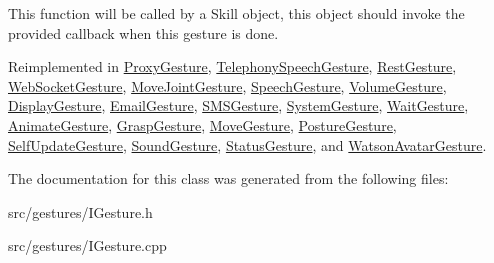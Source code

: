 This function will be called by a Skill object, this object should invoke the provided callback when this gesture is done. 

Reimplemented in \hyperlink{class_proxy_gesture_a771b299c01bfaac71566e0c42353f3bf}{Proxy\+Gesture}, \hyperlink{class_telephony_speech_gesture_a9ee4eca6da4830ddcbcffd5c3a13cd30}{Telephony\+Speech\+Gesture}, \hyperlink{class_rest_gesture_a84673c22b5a8d5c30b946149b4884d6c}{Rest\+Gesture}, \hyperlink{class_web_socket_gesture_ad783a6eef384b037b5272e41d86e1305}{Web\+Socket\+Gesture}, \hyperlink{class_move_joint_gesture_a05ffbd58e927b0f42aba6756925602ea}{Move\+Joint\+Gesture}, \hyperlink{class_speech_gesture_a353c573afdea4713e12e88de207b67ec}{Speech\+Gesture}, \hyperlink{class_volume_gesture_afa3847c6b25e72f1471501d86a110895}{Volume\+Gesture}, \hyperlink{class_display_gesture_a85bd298434073aa8d384ccbf520ef221}{Display\+Gesture}, \hyperlink{class_email_gesture_a18514859abb88f7f9d3912ecf124300f}{Email\+Gesture}, \hyperlink{class_s_m_s_gesture_ab857d98828882acecc1d5ecd0462a6f3}{S\+M\+S\+Gesture}, \hyperlink{class_system_gesture_ae7b4fc979652c0bcf1094b10864a9002}{System\+Gesture}, \hyperlink{class_wait_gesture_a2f775dd69f877bf21382e963af61c337}{Wait\+Gesture}, \hyperlink{class_animate_gesture_afa38a88906eb256fcaabe18e4c18b3eb}{Animate\+Gesture}, \hyperlink{class_grasp_gesture_adc88ab16d6d3bcbbbc06ea89b416f8b1}{Grasp\+Gesture}, \hyperlink{class_move_gesture_af3b5646e7942018b7b4ea8b0ecb46e69}{Move\+Gesture}, \hyperlink{class_posture_gesture_a0bfa3f0e2b3a9b3897ca69d4aa9aff2b}{Posture\+Gesture}, \hyperlink{class_self_update_gesture_adca477442d05fdd8ed80cdd963583ef9}{Self\+Update\+Gesture}, \hyperlink{class_sound_gesture_a378b3387a33072f25e9624fc4bde0dd3}{Sound\+Gesture}, \hyperlink{class_status_gesture_af2d43cd68d2831424d9bed4c8f59941d}{Status\+Gesture}, and \hyperlink{class_watson_avatar_gesture_af15fa364e5be7d7188285155035d7797}{Watson\+Avatar\+Gesture}.



The documentation for this class was generated from the following files\+:\begin{DoxyCompactItemize}
\item 
src/gestures/I\+Gesture.\+h\item 
src/gestures/I\+Gesture.\+cpp\end{DoxyCompactItemize}
